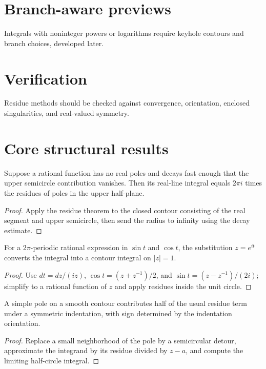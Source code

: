 \section{Branch-aware previews}
Integrals with noninteger powers or logarithms require keyhole contours and branch choices, developed later.

\section{Verification}
Residue methods should be checked against convergence, orientation, enclosed singularities, and real-valued symmetry.

\section{Core structural results}

\begin{theorem}\label{thm:iv11-01}
Suppose a rational function has no real poles and decays fast enough that the upper semicircle contribution vanishes. Then its real-line integral equals $2\pi i$ times the residues of poles in the upper half-plane.
\begin{proof}
Apply the residue theorem to the closed contour consisting of the real segment and upper semicircle, then send the radius to infinity using the decay estimate.
\end{proof}
\end{theorem}

\begin{theorem}\label{thm:iv11-02}
For a $2\pi$-periodic rational expression in $\sin t$ and $\cos t$, the substitution $z=e^{it}$ converts the integral into a contour integral on $|z|=1$.
\begin{proof}
Use $dt=dz/(iz)$, $\cos t=(z+z^{-1})/2$, and $\sin t=(z-z^{-1})/(2i)$; simplify to a rational function of $z$ and apply residues inside the unit circle.
\end{proof}
\end{theorem}

\begin{theorem}\label{thm:iv11-03}
A simple pole on a smooth contour contributes half of the usual residue term under a symmetric indentation, with sign determined by the indentation orientation.
\begin{proof}
Replace a small neighborhood of the pole by a semicircular detour, approximate the integrand by its residue divided by $z-a$, and compute the limiting half-circle integral.
\end{proof}
\end{theorem}

